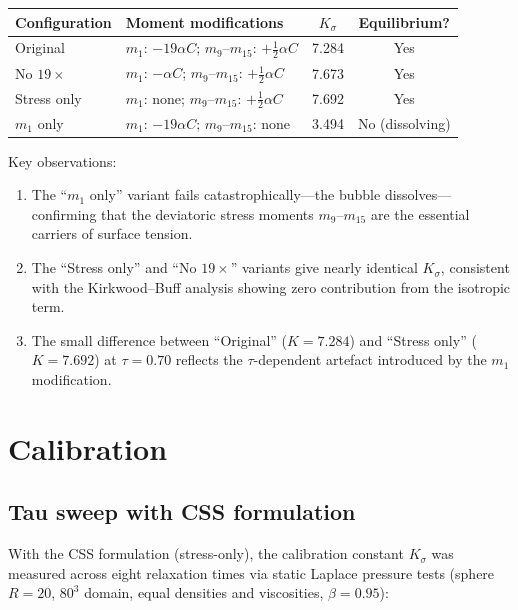 \documentclass[11pt,a4paper]{article}
\begin{document}
\begin{center}
\begin{tabular}{llcc}
  \toprule
  Configuration & Moment modifications & $K_\sigma$ & Equilibrium? \\
  \midrule
  Original       & $m_1$: $-19\alpha C$;\; $m_9$--$m_{15}$: $+\tfrac{1}{2}\alpha  C$
       & 7.284 & Yes \\
  No $19\times$  & $m_1$: $-\alpha C$;\; $m_9$--$m_{15}$: $+\tfrac{1}{2}\alpha C$
       & 7.673 & Yes \\
  Stress only    & $m_1$: none;\; $m_9$--$m_{15}$: $+\tfrac{1}{2}\alpha C$
       & 7.692 & Yes \\
  $m_1$ only     & $m_1$: $-19\alpha C$;\; $m_9$--$m_{15}$: none
       & 3.494 & No (dissolving) \\
  \bottomrule
\end{tabular}
\end{center}

Key observations:
\begin{enumerate}
\item The ``$m_1$ only'' variant fails catastrophically---the bubble
  dissolves---confirming that the deviatoric stress moments
  $m_9$--$m_{15}$ are the essential carriers of surface tension.
\item The ``Stress only'' and ``No $19\times$'' variants give nearly
  identical $K_\sigma$, consistent with the Kirkwood--Buff analysis
  showing zero contribution from the isotropic term.
\item The small difference between ``Original'' ($K=7.284$) and ``Stress
  only'' ($K=7.692$) at $\tau=0.70$ reflects the $\tau$-dependent
  artefact introduced by the $m_1$ modification.
\end{enumerate}

\section{Calibration}
\label{sec:calibration}

\subsection{Tau sweep with CSS formulation}

With the CSS formulation (stress-only), the calibration constant
$K_\sigma$ was measured across eight relaxation times via static Laplace
pressure tests (sphere $R=20$, $80^3$ domain, equal densities and
viscosities, $\beta=0.95$):
\end{document}
